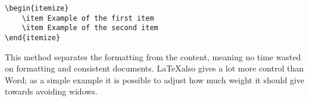 \begin{Verbatim}
\begin{itemize}
	\item Example of the first item
	\item Example of the second item
\end{itemize}
\end{Verbatim}

This method separates the formatting from the content, meaning no time wasted on formatting and consistent documents. \LaTeX also gives a lot more control than Word; as a simple example it is possible to adjust how much weight it should give towards avoiding widows.